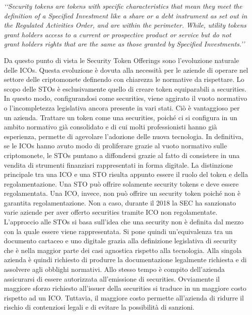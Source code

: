 \textit{‘‘Security tokens are tokens with specific characteristics that mean they meet the definition of a Specified Investment like a share or a debt instrument as set out in the Regulated Activities Order, and are within the perimeter.
While, utility tokens grant holders access to a current or prospective product or service but do not grant holders rights that are the same as those granted by Specified Investments.’’}

Da questo punto di vista le Security Token Offerings sono l'evoluzione naturale delle ICOs. Questa evoluzione è dovuta alla necessità per le aziende di operare nel settore delle criptomonete definendo con chiarezza le normative da rispettare. Lo scopo delle STOs è esclusivamente quello di creare token equiparabili a securities. In questo modo, configurandosi come securities, viene aggirato il vuoto normativo o l'incompletezza legislativa ancora presente in vari stati. Ciò è vantaggioso per un azienda. Trattare un token come una securities, poiché ci si configura in un ambito normativo già consolidato e di cui molti professionisti hanno già esperienza, permette di agevolare l'adozione delle nuova tecnologia. In definitiva, se le ICOs hanno avuto modo di proliferare grazie al vuoto normativo sulle criptomonete, le STOs puntano a diffondersi grazie al fatto di consistere in una vendita di strumenti finanziari rappresentati in forma digitale. La distinzione principale tra una ICO e una STO risulta appunto essere il ruolo del token e della regolamentazione. Una STO può offrire solamente security tokens e deve essere regolamentata. Una ICO, invece, non può offrire un security token poiché non è garantita regolamentazione. Non a caso, durante il 2018 la SEC ha sanzionato varie aziende per aver offerto securities tramite ICO non regolamentate. 
L'approccio alle STOs si basa sull'idea che una security non è definita dal mezzo con la quale essere viene rappresentata. Si pone quindi un'equivalenza tra un documento cartaceo e uno digitale grazia alla definizione legislativa di security che è nella maggior parte dei casi agnostica rispetto alla tecnologia. 
Alla singola azienda è quindi richiesto di produrre la documentazione legalmente richiesta e di assolvere agli obblighi normativi. Allo stesso tempo è compito dell'azienda assicurarsi di essere autorizzata all'emissione di securities. Ovviamente il maggiore sforzo richiesto all'issuer della securities si traduce in un maggiore costo rispetto ad un ICO. Tuttavia, il maggiore costo permette all'azienda di ridurre il rischio di contenziosi legali e di evitare la possibilità di sanzioni. 


